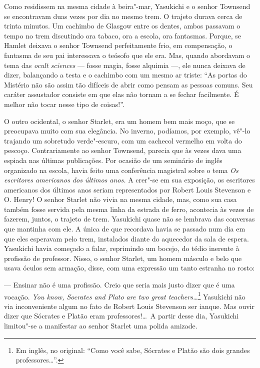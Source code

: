 Como residissem na mesma cidade à beira"-mar, Yasukichi e o senhor
Townsend se encontravam duas vezes por dia no mesmo trem. O trajeto
durava cerca de trinta minutos. Um cachimbo de Glasgow entre os dentes,
ambos passavam o tempo no trem discutindo ora tabaco, ora a escola, ora
fantasmas. Porque, se Hamlet deixava o senhor Townsend perfeitamente
frio, em compensação, o fantasma de seu pai interessava o teósofo que
ele era. Mas, quando abordavam o tema das \textit{ocult sciences} ---
fosse magia, fosse alquimia ---, ele nunca deixava de dizer, balançando a
testa e o cachimbo com um mesmo ar triste: ``As portas do Mistério não
são assim tão difíceis de abrir como pensam as pessoas comuns. Seu
caráter assustador consiste em que elas não tornam a se fechar
facilmente. É melhor não tocar nesse tipo de coisas!''.

O outro ocidental, o senhor Starlet, era um homem bem mais moço, que se
preocupava muito com sua elegância. No inverno, podíamos, por exemplo,
vê"-lo trajando um sobretudo verde"-escuro, com um cachecol vermelho em
volta do pescoço. Contrariamente ao senhor Townsend, parecia que às
vezes dava uma espiada nas últimas publicações. Por ocasião de um
seminário de inglês organizado na escola, havia feito uma conferência
magistral sobre o tema \textit{Os escritores americanos dos últimos anos.} 
A crer"-se em sua exposição, os escritores americanos dos
últimos anos seriam representados por Robert Louis Stevenson e O.
Henry! O senhor Starlet não vivia na mesma cidade, mas, como sua casa
também fosse servida pela mesma linha da estrada de ferro, acontecia às
vezes de fazerem, juntos, o trajeto de trem. Yasukichi quase não se
lembrava das conversas que mantinha com ele. A única de que recordava
havia se passado num dia em que eles esperavam pelo trem, instalados
diante do aquecedor da sala de espera. Yasukichi havia começado a
falar, reprimindo um bocejo, do tédio inerente à profissão de
professor. Nisso, o senhor Starlet, um homem másculo e belo que usava
óculos sem armação, disse, com uma expressão um tanto estranha no
rosto:

--- Ensinar não é uma profissão. Creio que seria mais justo dizer que é
uma vocação. \textit{You know, Socrates and Plato are two great
teachers\ldots{}}\footnote{Em inglês, no original: ``Como você sabe, Sócrates e Platão são dois
grandes professores\ldots{}''.} 
Yasukichi não via inconveniente algum no fato de Robert Louis Stevenson
ser ianque. Mas ouvir dizer que Sócrates e Platão eram professores!\ldots{}\
A partir desse dia, Yasukichi limitou"-se a manifestar ao senhor Starlet
uma polida amizade.

